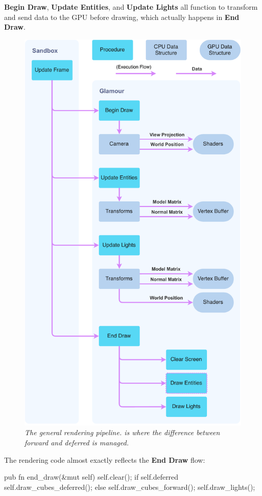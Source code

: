 \textbf{Begin Draw}, \textbf{Update Entities}, and \textbf{Update Lights} all function to transform and send data to the GPU before drawing, which actually happens in \textbf{End Draw}.

\begin{figure}
  \begin{center}
    \includegraphics[width=0.7\columnwidth]{../rendering-pipeline.pdf}
  \end{center}
  \caption[Rendering pipeline]{
    \emph{
      The general rendering pipeline.
       is where the difference between forward and deferred is managed.
    }
  }\label{fig:rendering-pipeline}
\end{figure}

The rendering code almost exactly reflects the \textbf{End Draw} flow:
  \begin{rustcode}
pub fn end_draw(&mut self) {
    self.clear();
    if self.deferred {
        self.draw_cubes_deferred();
    } else {
        self.draw_cubes_forward();
    }
    self.draw_lights();
}
  \end{rustcode}

